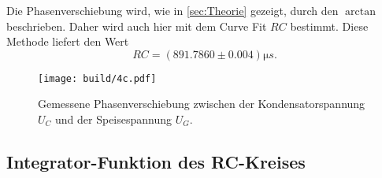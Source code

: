 Die Phasenverschiebung wird, wie in \autoref{sec:Theorie} gezeigt, durch den $\arctan$ beschrieben.
Daher wird auch hier mit dem Curve Fit $RC$ bestimmt. Diese Methode liefert den Wert
\begin{equation}
	RC = (891.7860 \pm 0.004) \si{\micro s}.
	\label{eqn:ergebniss-4c}
\end{equation}

\begin{figure}[H]
	\centering
	\texttt{[image: build/4c.pdf]}
	\caption{Gemessene Phasenverschiebung zwischen der Kondensatorspannung $U_C$ und der Speisespannung
	$U_G$.}
	\label{fig:4c.pdf}
\end{figure}



\newpage

\subsection{Integrator-Funktion des RC-Kreises}
\label{sec:4d-auswertung}



